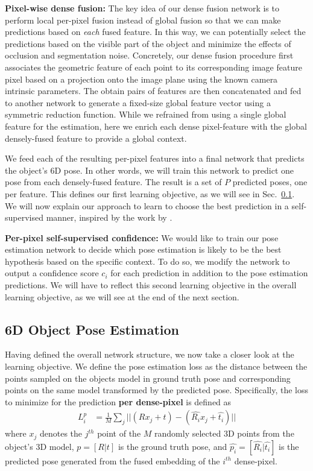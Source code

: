 \documentclass[10pt,twocolumn,letterpaper]{article}
\begin{document}
\noindent\textbf{Pixel-wise dense fusion:}
The key idea of our dense fusion network is to perform local per-pixel fusion instead of global fusion so that we can make predictions based on \emph{each} fused feature. In this way, we can potentially select the predictions based on the visible part of the object and minimize the effects of occlusion and segmentation noise. Concretely, our dense fusion procedure first associates the geometric feature of each point to its corresponding image feature pixel based on a projection onto the image plane using the known camera intrinsic parameters. The obtain pairs of features are then concatenated and fed to another network to generate a fixed-size global feature vector using a symmetric reduction function. While we refrained from using a single global feature for the estimation, here we enrich each dense pixel-feature with the global densely-fused feature to provide a global context.

We feed each of the resulting per-pixel features into a final network that predicts the object's 6D pose. In other words, we will train this network to predict one pose from each densely-fused feature. The result is a set of $P$ predicted poses, one per feature. This defines our first learning objective, as we will see in Sec.~\ref{ssec::loss}. We will now explain our approach to learn to choose the best prediction in a self-supervised manner, inspired by the work by \citet{xu2017pointfusion}.

\noindent\textbf{Per-pixel self-supervised confidence:}
We would like to train our pose estimation network to decide which pose estimation is likely to be the best hypothesis based on the specific context. To do so, we modify the network to output a confidence score $c_i$ for each prediction in addition to the pose estimation predictions. We will have to reflect this second learning objective in the overall learning objective, as we will see at the end of the next section.

\subsection{6D Object Pose Estimation}
\label{ssec::loss}
Having defined the overall network structure, we now take a closer look at the learning objective. We define the pose estimation loss as the distance between the points sampled on the objects model in ground truth pose and corresponding points on the same model transformed by the predicted pose.  Specifically, the loss to minimize for the prediction \textbf{per dense-pixel} is defined as
\begin{align}
L^{p}_{i} &= \frac{1}{M}\sum_{j}||(Rx_j + t) - (\hat{R_{i}}x_j + \hat{t_{i}})||
\end{align}
where $x_j$ denotes the $j^{th}$ point of the $M$ randomly selected 3D points from the object's 3D model, $p = [R|t]$ is the ground truth pose, and $\hat{p_{i}} = [\hat{R_{i}}|\hat{t_{i}}]$ is the predicted pose generated from the fused embedding of the $i^{th}$ dense-pixel. 
\end{document}

